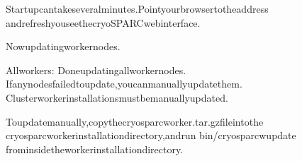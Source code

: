 \documentclass[a4paper,11pt,english]{sphinxmanual}
\begin{document}
\begin{sphinxVerbatim}[commandchars=\\\{\}]
Startupcantakeseveralminutes.Pointyourbrowsertotheaddress
andrefreshyouseethecryoSPARCwebinterface.

Nowupdatingworkernodes.

Allworkers:
\PYGZhy{}\PYGZhy{}\PYGZhy{}\PYGZhy{}\PYGZhy{}\PYGZhy{}\PYGZhy{}\PYGZhy{}\PYGZhy{}\PYGZhy{}\PYGZhy{}\PYGZhy{}\PYGZhy{}\PYGZhy{}\PYGZhy{}\PYGZhy{}\PYGZhy{}\PYGZhy{}\PYGZhy{}\PYGZhy{}\PYGZhy{}\PYGZhy{}\PYGZhy{}\PYGZhy{}\PYGZhy{}\PYGZhy{}\PYGZhy{}\PYGZhy{}\PYGZhy{}\PYGZhy{}\PYGZhy{}\PYGZhy{}\PYGZhy{}\PYGZhy{}\PYGZhy{}\PYGZhy{}\PYGZhy{}\PYGZhy{}\PYGZhy{}\PYGZhy{}\PYGZhy{}\PYGZhy{}\PYGZhy{}\PYGZhy{}\PYGZhy{}\PYGZhy{}\PYGZhy{}\PYGZhy{}\PYGZhy{}\PYGZhy{}\PYGZhy{}
Doneupdatingallworkernodes.
Ifanynodesfailedtoupdate,youcanmanuallyupdatethem.
Clusterworkerinstallationsmustbemanuallyupdated.

Toupdatemanually,copythecryosparc\PYGZus{}worker.tar.gzfileintothe
cryosparcworkerinstallationdirectory,andrun
\PYGZdl{}bin/cryosparcwupdate
frominsidetheworkerinstallationdirectory.
\end{sphinxVerbatim}
\end{document}
